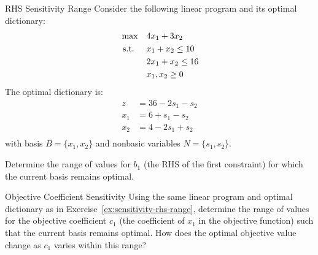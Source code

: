 \begin{ex}{RHS Sensitivity Range}{}
\label{ex:sensitivity-rhs-range}
 Consider the following linear program and its optimal dictionary:
\[
\begin{aligned}
\max \quad & 4x_1 + 3x_2 \\
\text{ s.t. } \quad
& x_1 + x_2 \leq 10 \\
& 2x_1 + x_2 \leq 16 \\
& x_1, x_2 \geq 0
\end{aligned}
\]
The optimal dictionary is:
\[
\begin{aligned}
z &= 36 - 2s_1 - s_2 \\
x_1 &= 6 + s_1 - s_2 \\
x_2 &= 4 - 2s_1 + s_2 \\
\end{aligned}
\]
with basis $B = \{x_1, x_2\}$ and nonbasic variables $N = \{s_1, s_2\}$.

Determine the range of values for $b_1$ (the RHS of the first constraint) for which the current basis remains optimal.
\exrefs{\S\ref{sec:sensitivity-rhs}}
\end{ex}


\begin{ex}{Objective Coefficient Sensitivity}{}
 Using the same linear program and optimal dictionary as in Exercise~\ref{ex:sensitivity-rhs-range}, determine the range of values for the objective coefficient $c_1$ (the coefficient of $x_1$ in the objective function) such that the current basis remains optimal. How does the optimal objective value change as $c_1$ varies within this range?
\exrefs{\S\ref{sec:sensitivity-cost}}
\end{ex}

